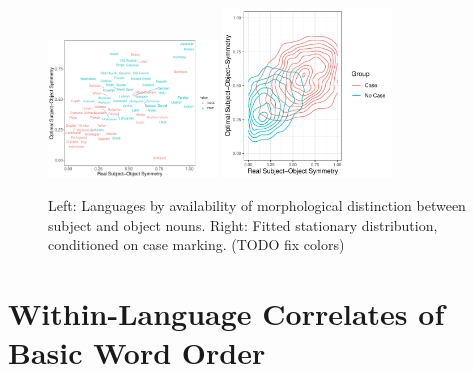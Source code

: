 \documentclass[11pt,a4paper]{article}
\newcommand\mhahn[1]{{\color{red}(#1)}}
\begin{document}
\begin{figure}
    \centering
    \includegraphics[width=0.4\textwidth]{../analysis/figures/by_patient_marking.pdf}
    \includegraphics[width=0.4\textwidth]{../change/visualize/stationary_case.pdf}
    \caption{Left: Languages by availability of morphological distinction between subject and object nouns. Right: Fitted stationary distribution, conditioned on case marking. \mhahn{TODO fix colors}}
    \label{fig:langs-case}
\end{figure}






\section{Within-Language Correlates of Basic Word Order}
\end{document}
